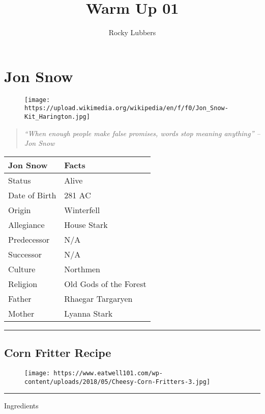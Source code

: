 \documentclass[]{article}
\title{Warm Up 01}
\author{Rocky Lubbers}
\date{}
\begin{document}
\maketitle

\section{Jon Snow}\label{jon-snow}

\begin{figure}
\centering
\texttt{[image: https://upload.wikimedia.org/wikipedia/en/f/f0/Jon\_Snow-Kit\_Harington.jpg]}
\caption{}
\end{figure}

\begin{quote}
\emph{``When enough people make false promises,\emph{ }words stop
meaning anything'' -- Jon Snow}
\end{quote}

\begin{longtable}[]{@{}ll@{}}
\toprule
Jon Snow & Facts\tabularnewline
\midrule
\endhead
Status & Alive\tabularnewline
Date of Birth & 281 AC\tabularnewline
Origin & Winterfell\tabularnewline
Allegiance & House Stark\tabularnewline
Predecessor & N/A\tabularnewline
Successor & N/A\tabularnewline
Culture & Northmen\tabularnewline
Religion & Old Gods of the Forest\tabularnewline
Father & Rhaegar Targaryen\tabularnewline
Mother & Lyanna Stark\tabularnewline
\bottomrule
\end{longtable}

\begin{center}\rule{0.5\linewidth}{\linethickness}\end{center}

\subsection{Corn Fritter Recipe}\label{corn-fritter-recipe}

\begin{figure}
\centering
\texttt{[image: https://www.eatwell101.com/wp-content/uploads/2018/05/Cheesy-Corn-Fritters-3.jpg]}
\caption{}
\end{figure}

\begin{center}\rule{0.5\linewidth}{\linethickness}\end{center}

Ingredients
\end{document}
